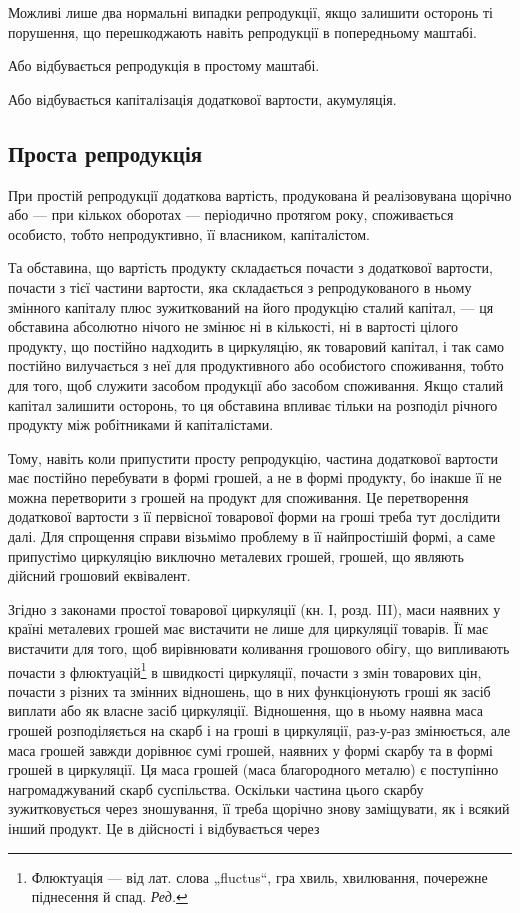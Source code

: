 
Можливі лише два нормальні випадки репродукції, якщо залишити
осторонь ті порушення, що перешкоджають навіть репродукції в попередньому
маштабі.

Або відбувається репродукція в простому маштабі.

Або відбувається капіталізація додаткової вартости, акумуляція.

\subsection{Проста репродукція}

При простій репродукції додаткова вартість, продукована й реалізовувана
щорічно або — при кількох оборотах — періодично протягом року,
споживається особисто, тобто непродуктивно, її власником, капіталістом.

Та обставина, що вартість продукту складається почасти з додаткової
вартости, почасти з тієї частини вартости, яка складається з репродукованого
в ньому змінного капіталу плюс зужиткований на його продукцію
сталий капітал, — ця обставина абсолютно нічого не змінює ні в кількості,
ні в вартості цілого продукту, що постійно надходить в циркуляцію, як
товаровий капітал, і так само постійно вилучається з неї для продуктивного
або особистого споживання, тобто для того, щоб служити засобом
продукції або засобом споживання. Якщо сталий капітал залишити осторонь,
то ця обставина впливає тільки на розподіл річного продукту між
робітниками й капіталістами.

Тому, навіть коли припустити просту репродукцію, частина додаткової
вартости має постійно перебувати в формі грошей, а не в формі
продукту, бо інакше її не можна перетворити з грошей на продукт для
споживання. Це перетворення додаткової вартости з її первісної товарової
форми на гроші треба тут дослідити далі. Для спрощення справи
візьмімо проблему в її найпростішій формі, а саме припустімо циркуляцію
виключно металевих грошей, грошей, що являють дійсний грошовий еквівалент.

Згідно з законами простої товарової циркуляції (кн. І, розд. III), маси
наявних у країні металевих грошей має вистачити не лише для
циркуляції товарів. Її має вистачити для того, щоб вирівнювати коливання
грошового обігу, що випливають почасти з флюктуацій\footnote*{
Флюктуація — від лат. слова „fluctus“, гра хвиль, хвилювання, почережне
піднесення й спад. \emph{Ред.}
} в швидкості
циркуляції, почасти з змін товарових цін, почасти з різних та
змінних відношень, що в них функціонують гроші як засіб виплати або
як власне засіб циркуляції. Відношення, що в ньому наявна маса грошей
розподіляється на скарб і на гроші в циркуляції, раз-у-раз змінюється, але
маса грошей завжди дорівнює сумі грошей, наявних у формі скарбу та
в формі грошей в циркуляції. Ця маса грошей (маса благородного металю)
є поступінно нагромаджуваний скарб суспільства. Оскільки частина цього
скарбу зужитковується через зношування, її треба щорічно знову заміщувати,
як і всякий інший продукт. Це в дійсності і відбувається через
\parbreak{}  %
